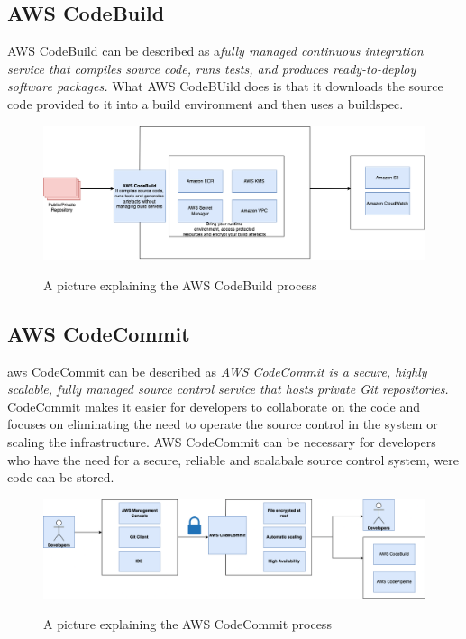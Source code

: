 \subsection{AWS CodeBuild }
AWS CodeBuild can be described as a\textit{fully managed continuous integration service that compiles source code, runs tests, and produces ready-to-deploy software packages.} 
\cite{AWSCodeBuild}
What AWS CodeBUild does is that it downloads the source code provided to it into a build environment and then uses a \Gls{buildspec}.\cite{AWSCodeBuild1}
\begin{figure}[htp]
    \centering
    \includegraphics[width=1\columnwidth]{Images/CodeBuild.png}
    \caption{A picture explaining the AWS CodeBuild process}\cite{AWSCodeBuild}
    \label{fig:my_label}
\end{figure}
\newpage
\subsection{AWS CodeCommit}

\acrshort{aws} CodeCommit can be described as \textit{AWS CodeCommit is a secure, highly scalable, fully managed source control service that hosts private Git repositories.}
\cite{AWSCodeCommit1}
CodeCommit makes it easier for developers to collaborate on the code and focuses on eliminating the need to operate the source control in the system or scaling the infrastructure. AWS CodeCommit can be necessary for developers who have the need for a secure, reliable and scalabale source control system, were code can be stored. \cite{AWSCodeCommit}
\begin{figure}[htp]
    \centering
    \includegraphics[width=1\columnwidth]{Images/CodeCommit.png}
    \caption{A picture explaining the AWS CodeCommit process}\cite{AWSCodeCommit1}
    \label{fig:my_label}
\end{figure}

